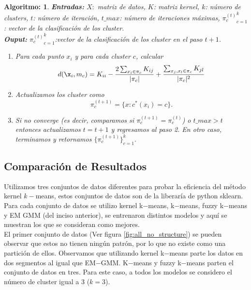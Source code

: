 \documentclass[paper=letter, fontsize=11pt]{scrartcl}
\newtheorem{thma}{Algoritmo:}
\numberwithin{equation}{section} %
\numberwithin{figure}{section} %
\numberwithin{table}{section} %
\begin{document}
\begin{framed}
    \begin{thma} \label{a_kernel}
	\textbf{Entradas:} $X:$ matriz de datos, $K$: matriz kernel, $k$: número de clusters, $t$: número de iteración, $t\_max$: número de iteraciones máximas, ${\pi_c^{(t)}}_{c=1}^k$: vector de la clasificación de los cluster.\\
	\textbf{Ouput:} ${\pi_c^{(t)}}_{c=1}^k$:vector de la clasificación de los cluster en el paso $t+1$.
	\begin{enumerate}
	    \item Para cada punto $x_i$ y para cada cluster $c$, calcular 
	    \begin{align*}
    d(\x_i, m_c) = K_{ii}-\frac{2\sum_{x_i\in \pi_c}K_{ij}}{|\pi_c|}+\frac{\sum_{x_j,x_l\in \pi_c}K_{jl}}{|\pi_c|^2}
\end{align*}

    \item Actualizamos los cluster como
    $$\pi_c^{(t+1)}=\{x:c^*(x_i)=c\}.$$

    \item Si no converge (es decir, comparamos si $\pi_c^{(t+1)}=\pi_c^{(t)}$) o $t\_max>t$ entonces actualizamos $t=t+1$ y regresamos al paso 2. En otro caso, terminamos y retornamos $\{\pi_c^{(t+1)}\}_{c=1}^k.$
	\end{enumerate}
    \end{thma}
\end{framed}

\subsection{Comparación de Resultados} \label{compa}
Utilizamos tres conjuntos de datos diferentes para probar la eficiencia del método kernel $k-$means, estos conjuntos de datos son de la liberaría de python sklearn\cite{scikit-learn}. Para cada conjunto de datos se utilizo kernel k$-$means, k$-$means, fuzzy k$-$means y EM GMM (del inciso anterior), se entrenaron distintos modelos y aquí se muestran los que se consideran como mejores.\\ 

El primer conjunto de datos (Ver figura \ref{fig:all_no_structure}) se pueden observar que estos no tienen ningún patrón, por lo que no existe como una partición de ellos. Observamos que utilizando kernel k$-$means parte los datos en dos segmentos al igual que EM$-$GMM. K$-$means y fuzzy k$-$means parten el conjunto de datos en tres. Para este caso, a todos los modelos se considero el número de cluster igual a 3 ($k=3$).\\
\end{document}
